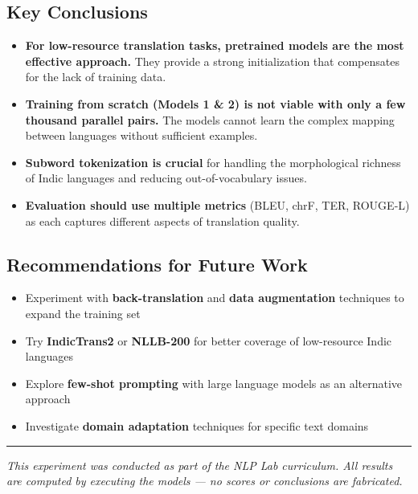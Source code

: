 \documentclass[12pt,a4paper,oneside]{report}
\providecommand{\tightlist}{\setlength{\itemsep}{0pt}\setlength{\parskip}{0pt}}
\begin{document}
\hypertarget{key-conclusions}{%
\subsection{Key Conclusions}\label{key-conclusions}}

\begin{itemize}
\tightlist
\item
  \textbf{For low-resource translation tasks, pretrained models are the most effective approach.} They provide a strong initialization that compensates for the lack of training data.
\item
  \textbf{Training from scratch (Models 1 \& 2) is not viable with only a few thousand parallel pairs.} The models cannot learn the complex mapping between languages without sufficient examples.
\item
  \textbf{Subword tokenization is crucial} for handling the morphological richness of Indic languages and reducing out-of-vocabulary issues.
\item
  \textbf{Evaluation should use multiple metrics} (BLEU, chrF, TER, ROUGE-L) as each captures different aspects of translation quality.
\end{itemize}

\hypertarget{recommendations-for-future-work}{%
\subsection{Recommendations for Future Work}\label{recommendations-for-future-work}}

\begin{itemize}
\tightlist
\item
  Experiment with \textbf{back-translation} and \textbf{data augmentation} techniques to expand the training set
\item
  Try \textbf{IndicTrans2} or \textbf{NLLB-200} for better coverage of low-resource Indic languages
\item
  Explore \textbf{few-shot prompting} with large language models as an alternative approach
\item
  Investigate \textbf{domain adaptation} techniques for specific text domains
\end{itemize}

\begin{center}\rule{0.5\linewidth}{0.5pt}\end{center}

\emph{This experiment was conducted as part of the NLP Lab curriculum. All results are computed by executing the models --- no scores or conclusions are fabricated.}
\end{document}
